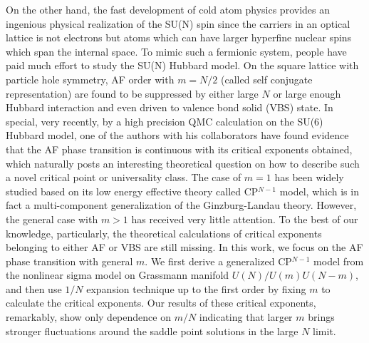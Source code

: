 \documentclass[aps,twocolumn,superscriptaddress]{revtex4-1}
\begin{document}
On the other hand, the fast development of cold atom physics provides an ingenious physical realization of the SU(N)
spin since the carriers in an optical lattice is not electrons but atoms which can have larger hyperfine nuclear spins
which span the internal space.
\cite{wu2003,wu2005,*wu2006,honerkamp2004,taie2010,desalvo2010,krauser2012,zhang2014,hart2015} To mimic such a
fermionic system, people have paid much effort to study the SU(N) Hubbard model.
\cite{honerkamp2004,assaad2005,cai2013a,cai2013,wang2014,zhou2014,*zhou2016,*zhou2017} On the square lattice with
particle hole symmetry, AF order with $m=N/2$ (called self conjugate representation) are found to be suppressed by
either large $N$ or large enough Hubbard interaction and even driven to valence bond solid (VBS) state.
\cite{cai2013,wang2014} In special, very recently, by a high precision QMC calculation on the SU(6) Hubbard model, one of the authors
with his collaborators have found evidence that the AF phase transition is continuous with its critical exponents obtained, 
\cite{wang2014,wang2018} which naturally posts an interesting theoretical question on how to describe such a novel critical point
or universality class. The case of $m=1$ has been widely studied based on its low energy effective theory
called CP$^{N-1}$ model, which is in fact a multi-component generalization of the Ginzburg-Landau theory.
\cite{halperin1974,hikami1979,read1989,read1989a,starykh1994,irkhin1996,kaul2008,block2013,demidio2017} However, the
general case with $m>1$ has received very little attention. \cite{macfarlane1979,hikami1980,duerksen1981,maharana1983}
To the best of our knowledge, particularly, the theoretical calculations of critical exponents belonging to either AF or
VBS are still missing. In this work, we focus on the AF phase transition with general $m$. We first derive a generalized
CP$^{N-1}$ model from the nonlinear sigma model on Grassmann manifold $U(N)/U(m)U(N-m)$, and then use $1/N$ expansion
technique up to the first order by fixing $m$ to calculate the critical exponents. Our results of these critical exponents, remarkably,
show only dependence on $m/N$ indicating that larger $m$ brings stronger fluctuations around the saddle point solutions
in the large $N$ limit.
\end{document}
